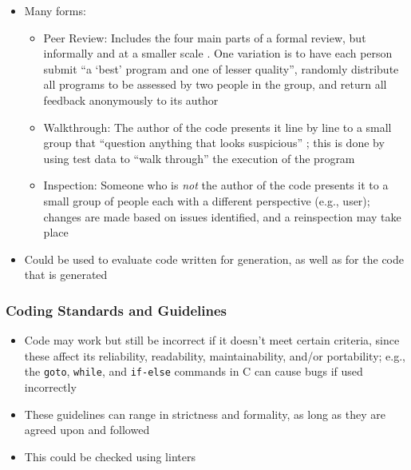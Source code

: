 \begin{itemize}
      \item Many forms:
            \begin{itemize}
                  \item Peer Review: Includes the four main parts of a formal
                        review, but informally and at a smaller scale
                        \cite[p.~94]{patton_software_2006}. One variation is to
                        have each person submit ``a `best' program and one of
                        lesser quality'', randomly distribute all programs to
                        be assessed by two people in the group, and return all
                        feedback anonymously to its author
                        \cite[p.~414]{van_vliet_software_2000}
                  \item Walkthrough: The author of the code presents it line
                        by line to a small group that ``question anything that
                        looks suspicious'' \cite[p.~95]{patton_software_2006};
                        this is done by using test data to ``walk through''
                        the execution of the program
                        \cite[p.~416]{van_vliet_software_2000}
                  \item Inspection: Someone who is \emph{not} the author of the
                        code presents it to a small group of people each with a
                        different perspective (e.g., user); changes are made
                        based on issues identified, and a reinspection may take
                        place \cite[p.~95]{patton_software_2006}
            \end{itemize}

      \item Could be used to evaluate code written for generation, as well as
            for the code that is generated
\end{itemize}

\subsubsection{Coding Standards and Guidelines \cite[p.~96-99]{patton_software_2006}}

\begin{itemize}
      \item Code may work but still be incorrect if it doesn't meet certain
            criteria, since these affect its reliability, readability,
            maintainability, and/or portability; e.g., the \texttt{goto},
            \texttt{while}, and \texttt{if-else} commands in C can cause bugs
            if used incorrectly \cite[p.~96]{patton_software_2006}
      \item These guidelines can range in strictness and formality, as long as
            they are agreed upon and followed \cite[p.~96]{patton_software_2006}
      \item This could be checked using linters
\end{itemize}

